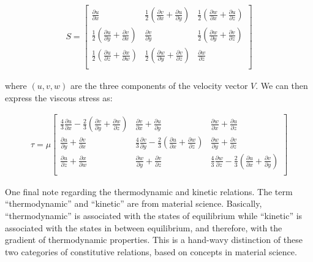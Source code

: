 \documentclass[12pt, letterpaper]{report}
\begin{document}
\begin{align}\label{eqstrainrate}
   S = 
   \begin{bmatrix}
      \frac{\partial u}{\partial x} & \frac{1}{2}(\frac{\partial v}{\partial x}+\frac{\partial
      u}{\partial y}) & \frac{1}{2}(\frac{\partial w}{\partial x} + \frac{\partial u}{\partial z})
      \\ \frac{1}{2}(\frac{\partial u}{\partial y} + \frac{\partial v}{\partial x}) & \frac{\partial
      v}{\partial y} & \frac{1}{2}(\frac{\partial w}{\partial y} + \frac{\partial v}{\partial z}) \\
      \frac{1}{2}(\frac{\partial u}{\partial z} + \frac{\partial x}{\partial w}) &
      \frac{1}{2}(\frac{\partial w}{\partial y} + \frac{\partial v}{\partial z}) &  \frac{\partial
      w}{\partial z} \\
   \end{bmatrix}
\end{align}

where $(u,v,w)$ are the three components of the velocity vector $V$. We can then express the
viscous stress as:

\begin{align}\label{eqviscousstress}
   \tau = \mu 
   \begin{bmatrix} 
      \frac{4}{3}\frac{\partial u}{\partial x} - \frac{2}{3}(\frac{\partial v}{\partial y} +
      \frac{\partial w}{\partial z}) & \frac{\partial v}{\partial x}+\frac{\partial u}{\partial y} &
      \frac{\partial w}{\partial x} + \frac{\partial u}{\partial z} \\ \frac{\partial u}{\partial y}
      + \frac{\partial v}{\partial x} & \frac{4}{3}\frac{\partial v}{\partial
         y}-\frac{2}{3}(\frac{\partial u}{\partial x} + \frac{\partial w}{\partial z}) &
         \frac{\partial w}{\partial y} + \frac{\partial v}{\partial z} \\ \frac{\partial u}{\partial
         z} + \frac{\partial x}{\partial w} & \frac{\partial w}{\partial y} + \frac{\partial
         v}{\partial z} & \frac{4}{3}\frac{\partial w}{\partial z} - \frac{2}{3}(\frac{\partial
      u}{\partial x} +\frac{\partial v}{\partial y})\\
   \end{bmatrix}
\end{align}



One final note regarding the
thermodynamic and kinetic relations. The term ``thermodynamic'' and ``kinetic'' are from material
science. Basically, ``thermodynamic'' is associated with the states of equilibrium while
``kinetic'' is associated with the states in between equilibrium, and therefore, with the gradient
of thermodynamic properties. This is a hand-wavy distinction of these two categories of constitutive
relations, based on concepts in material science.
\paraspace
\end{document}
